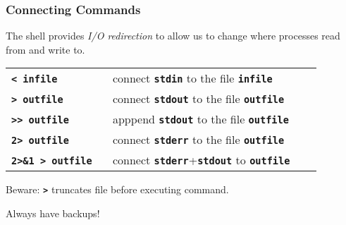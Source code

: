 \begin{frame}[shrink]
\frametitle{Connecting Commands}
The shell provides {\em{I/O redirection}} to allow us to change
where processes read from and write to.


\begin{center}
\begin{tabular}{lll}

   \begin{minipage}{3cm}\textbf{\tt{< infile}} ~\end{minipage}
    & \begin{minipage}{18cm}connect \textbf{\tt{stdin}} to the file \textbf{\tt{infile}}~\end{minipage}
\\[1ex]

   \begin{minipage}{3cm}\textbf{\tt{> outfile}} ~\end{minipage}
    & \begin{minipage}{18cm}connect \textbf{\tt{stdout}} to the file \textbf{\tt{outfile}}~\end{minipage}
\\[1ex]

   \begin{minipage}{3cm}\textbf{\tt{>> outfile}} ~\end{minipage}
    & \begin{minipage}{18cm}apppend \textbf{\tt{stdout}} to the file \textbf{\tt{outfile}}~\end{minipage}
\\[1ex]

   \begin{minipage}{3cm}\textbf{\tt{2> outfile}} ~\end{minipage}
    & \begin{minipage}{18cm}connect \textbf{\tt{stderr}} to the file \textbf{\tt{outfile}}~\end{minipage}
\\[1ex]

   \begin{minipage}{3cm}\textbf{\tt{2>\&1 > outfile}} ~\end{minipage}
    & \begin{minipage}{18cm}connect \textbf{\tt{stderr}}+\textbf{\tt{stdout}} to \textbf{\tt{outfile}} ~\end{minipage}
\\[1ex]
\end{tabular}
\end{center}

Beware: \textbf{\tt{>}} truncates file before executing command.

Always have backups!
\end{frame}

